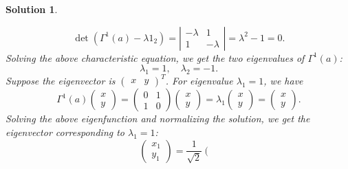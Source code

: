 \documentclass[UTF8,10pt,a4paper]{article}
\theoremstyle{Problem}
\theoremstyle{Solution}
\newtheorem*{sol}{Solution}
\begin{document}
\begin{sol}
\begin{enumerate}
        \begin{equation}
            \det(\Gamma^1(a)-\lambda 1_2)=\left\lvert\begin{matrix}
                -\lambda&1\\
                1&-\lambda
            \end{matrix}\right\rvert=\lambda^2-1=0.
        \end{equation}
        Solving the above characteristic equation, we get the two eigenvalues of $\Gamma^1(a)$:
        \begin{equation}
            \lambda_1=1,\quad\lambda_2=-1.
        \end{equation}
        Suppose the eigenvector is $\left(\begin{matrix}
            x&y
        \end{matrix}\right)^T$. For eigenvalue $\lambda_1=1$, we have
        \begin{equation}
            \Gamma^1(a)\left(\begin{matrix}
                x\\
                y
            \end{matrix}\right)=\left(\begin{matrix}
                0&1\\
                1&0
            \end{matrix}\right)\left(\begin{matrix}
                x\\
                y
            \end{matrix}\right)=\lambda_1\left(\begin{matrix}
                x\\
                y
            \end{matrix}\right)=\left(\begin{matrix}
                x\\
                y
            \end{matrix}\right).
        \end{equation}
        Solving the above eigenfunction and normalizing the solution, we get the eigenvector corresponding to $\lambda_1=1$:
        \begin{equation}
            \left(\begin{matrix}
                x_1\\
                y_1
            \end{matrix}\right)=\frac{1}{\sqrt{2}}\left(\begin{matrix}

\end{matrix}
\end{equation}
\end{enumerate}
\end{sol}
\end{document}
